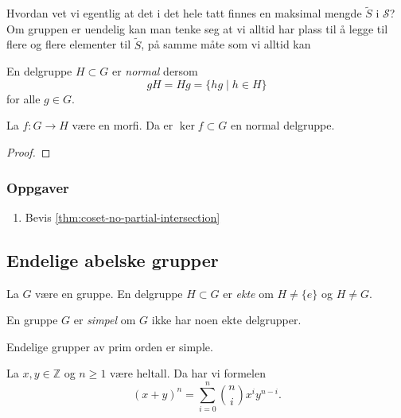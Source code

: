 \begin{remark}
    Hvordan vet vi egentlig at det i det hele tatt finnes en maksimal
    mengde $\tilde S$ i $\mathcal S$?
    Om gruppen er uendelig kan man tenke seg at vi alltid
    har plass til å legge til flere og flere elementer til $\tilde S$,
    på samme måte som vi alltid kan
\end{remark}

\begin{definition}
    En delgruppe $H\subset G$ er \textit{normal}
    dersom
    \[
        gH = Hg = \{hg\mid h\in H\}
    \]
    for alle $g\in G$.
\end{definition}

\begin{lemma}
    La $f\colon G\to H$ være en morfi.
    Da er $\ker f\subset G$ en normal delgruppe.
\end{lemma}
\begin{proof}
\end{proof}

\subsubsection*{Oppgaver}

\begin{enumerate}
    \item Bevis \cref{thm:coset-no-partial-intersection}
\end{enumerate}

\subsection{Endelige abelske grupper}

\begin{definition}
    La $G$ være en gruppe.
    En delgruppe $H\subset G$ er \textit{ekte}
    om $H\neq \{e\}$ og $H\neq G$.

    En gruppe $G$ er \textit{simpel} om $G$ ikke har noen ekte delgrupper.
\end{definition}

\begin{theorem}
    Endelige grupper av prim orden er simple.
\end{theorem}

\begin{lemma}\label{thm:binomial-identity}
    La $x,y\in \mathbb Z$  og $n \geq 1$ være heltall.
    Da har vi formelen
    \[
        (x + y)^n = \sum_{i = 0}^n \binom n i x^i y^{n - i}.
    \]
\end{lemma}


